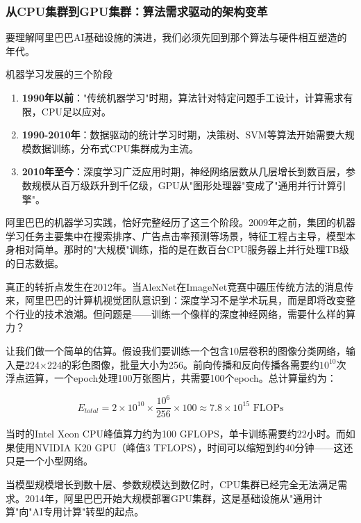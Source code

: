 \subsubsection{从CPU集群到GPU集群：算法需求驱动的架构变革}

要理解阿里巴巴AI基础设施的演进，我们必须先回到那个算法与硬件相互塑造的年代。

\begin{insightbox}{机器学习发展的三个阶段}
\begin{enumerate}
    \item \textbf{1990年以前}："传统机器学习"时期，算法针对特定问题手工设计，计算需求有限，CPU足以应对。
    \item \textbf{1990-2010年}：数据驱动的统计学习时期，决策树、SVM等算法开始需要大规模数据训练，分布式CPU集群成为主流。
    \item \textbf{2010年至今}：深度学习广泛应用时期，神经网络层数从几层增长到数百层，参数规模从百万级跃升到千亿级，GPU从"图形处理器"变成了"通用并行计算引擎"。
\end{enumerate}
\end{insightbox}

阿里巴巴的机器学习实践，恰好完整经历了这三个阶段。2009年之前，集团的机器学习任务主要集中在搜索排序、广告点击率预测等场景，特征工程占主导，模型本身相对简单。那时的"大规模"训练，指的是在数百台CPU服务器上并行处理TB级的日志数据。

真正的转折点发生在2012年。当AlexNet在ImageNet竞赛中碾压传统方法的消息传来，阿里巴巴的计算机视觉团队意识到：深度学习不是学术玩具，而是即将改变整个行业的技术浪潮。但问题是——训练一个像样的深度神经网络，需要什么样的算力？

让我们做一个简单的估算。假设我们要训练一个包含10层卷积的图像分类网络，输入是224×224的彩色图像，批量大小为256。前向传播和反向传播各需要约$10^{10}$次浮点运算，一个epoch处理100万张图片，共需要100个epoch。总计算量约为：

\begin{equation}
E_{total} = 2 \times 10^{10} \times \frac{10^6}{256} \times 100 \approx 7.8 \times 10^{15} \text{ FLOPs}
\end{equation}

当时的Intel Xeon CPU峰值算力约为100 GFLOPS，单卡训练需要约22小时。而如果使用NVIDIA K20 GPU（峰值3 TFLOPS），时间可以缩短到约40分钟——这还只是一个小型网络。

当模型规模增长到数十层、参数规模达到数亿时，CPU集群已经完全无法满足需求。2014年，阿里巴巴开始大规模部署GPU集群，这是基础设施从"通用计算"向"AI专用计算"转型的起点。

